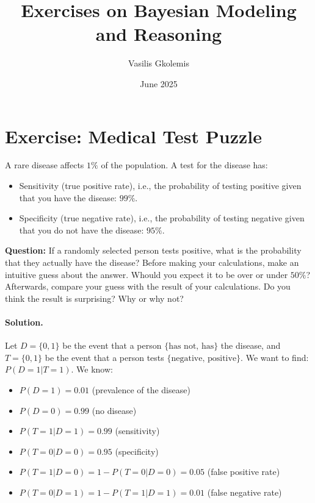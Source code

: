 \documentclass[11pt]{article}
\title{Exercises on Bayesian Modeling and Reasoning}
\author{Vasilis Gkolemis}
\date{June 2025}
\newif\ifshowanswers
\begin{document}
\maketitle

\section{Exercise: Medical Test Puzzle}
A rare disease affects $1\%$ of the population. A test for the disease has:
\begin{itemize}
  \item Sensitivity (true positive rate), i.e., the probability of testing positive given that you have the disease: $99\%$.
  \item Specificity (true negative rate), i.e., the probability of testing negative given that you do not have the disease: $95\%$.
  \end{itemize}

\noindent
\textbf{Question:}
If a randomly selected person tests positive, what is the probability that they actually have the disease?
Before making your calculations, make an intuitive guess about the answer. Whould you expect it to be over or under $50\%$?
Afterwards, compare your guess with the result of your calculations.
Do you think the result is surprising? Why or why not?

\ifshowanswers
\paragraph{Solution.}

Let $D = \{0, 1\}$ be the event that a person $\{\text{has not, has}\}$ the disease,
and
$T = \{0, 1\}$ be the event that a person tests $\{\text{negative, positive}\}$.
We want to find: $P(D = 1 | T = 1)$.
We know:

\begin{itemize}
  \item $P(D = 1) = 0.01$ (prevalence of the disease)
  \item $P(D = 0) = 0.99$ (no disease)
  \item $P(T = 1 | D = 1) = 0.99$ (sensitivity)
  \item $P(T = 0 | D = 0) = 0.95$ (specificity)
  \item $P(T = 1 | D = 0) = 1 - P(T = 0 | D = 0) = 0.05$ (false positive rate)
  \item $P(T = 0 | D = 1) = 1 - P(T = 1 | D = 1) = 0.01$ (false negative rate)
\end{itemize}
\end{document}
